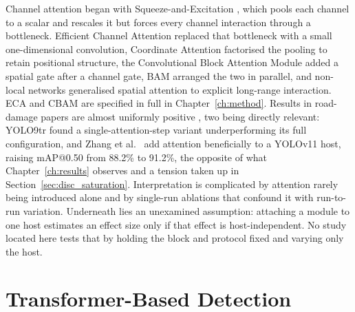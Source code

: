 \documentclass[MScCS]{uccthesis}
\begin{document}
Channel attention began with Squeeze-and-Excitation \parencite{hu2018squeeze},
which pools each channel to a scalar and rescales it but forces every channel
interaction through a bottleneck. Efficient Channel Attention
\parencite{wang2020eca} replaced that bottleneck with a small one-dimensional
convolution, Coordinate Attention \parencite{hou2021coordinate} factorised the
pooling to retain positional structure, the Convolutional Block Attention Module
\parencite{woo2018cbam} added a spatial gate after a channel gate, BAM
\parencite{park2018bam} arranged the two in parallel, and non-local networks
\parencite{wang2018nonlocal} generalised spatial attention to explicit
long-range interaction. ECA and CBAM are specified in full in
Chapter~\ref{ch:method}. Results in road-damage papers are almost uniformly
positive \parencite{pei2024yolordd,chen2024lrsyolo,pham2024optimizing}, two
being directly relevant: YOLO9tr \parencite{youwai2024yolo9tr} found a
single-attention-step variant underperforming its full configuration, and Zhang
et al.~\parencite{zhang2025automatic} add attention beneficially to a YOLOv11
host, raising mAP@0.50 from 88.2\% to 91.2\%, the opposite of what
Chapter~\ref{ch:results} observes and a tension taken up in
Section~\ref{sec:disc_saturation}. Interpretation is complicated by attention
rarely being introduced alone
\parencite{chen2024lrsyolo,pei2024yolordd,zhang2025automatic,lu2025fmsyolo} and
by single-run ablations that confound it with run-to-run variation.
Underneath lies an unexamined assumption: attaching a module to one host
estimates an effect size only if that effect is host-independent. No study
located here tests that by holding the block and protocol fixed and varying only
the host.


\section{Transformer-Based Detection}
\label{sec:transformers_related}
\end{document}
